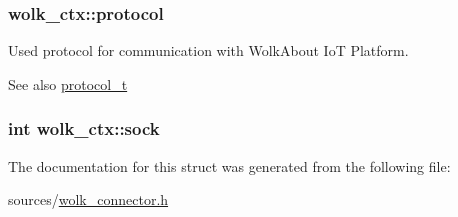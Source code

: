 \subsubsection[{\texorpdfstring{protocol}{protocol}}]{ wolk\+\_\+ctx\+::protocol}\hypertarget{structwolk__ctx_af93f257ff60dd00f34455d425207e66f}{}\label{structwolk__ctx_af93f257ff60dd00f34455d425207e66f}
Used protocol for communication with Wolk\+About IoT Platform. \begin{DoxySeeAlso}{See also}
\hyperlink{wolk__connector_8h_a91e19fa4fff461493e1a41f7c7aa4e5f}{protocol\+\_\+t} 
\end{DoxySeeAlso}
\subsubsection[{\texorpdfstring{sock}{sock}}]{\setlength{\rightskip}{0pt plus 5cm}int wolk\+\_\+ctx\+::sock}\hypertarget{structwolk__ctx_a7b2318c99408cdafb7ede7f5d472e100}{}\label{structwolk__ctx_a7b2318c99408cdafb7ede7f5d472e100}


The documentation for this struct was generated from the following file\+:\begin{DoxyCompactItemize}
\item 
sources/\hyperlink{wolk__connector_8h}{wolk\+\_\+connector.\+h}\end{DoxyCompactItemize}
